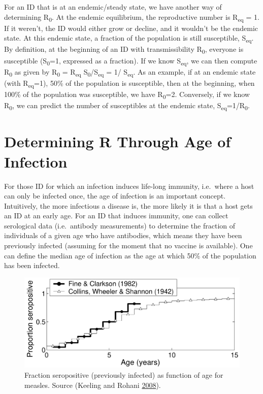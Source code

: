 \documentclass[]{book}
\theoremstyle{definition}
\theoremstyle{definition}
\theoremstyle{definition}
\theoremstyle{remark}
\begin{document}
For an ID that is at an endemic/steady state, we have another way of
determining R\textsubscript{0}. At the endemic equilibrium, the
reproductive number is R\textsubscript{eq} = 1. If it weren't, the ID
would either grow or decline, and it wouldn't be the endemic state. At
this endemic state, a fraction of the population is still susceptible,
S\textsubscript{eq}. By definition, at the beginning of an ID with
transmissibility R\textsubscript{0}, everyone is susceptible
(S\textsubscript{0}=1, expressed as a fraction). If we know
S\textsubscript{eq}, we can then compute R\textsubscript{0} as given by
R\textsubscript{0} = R\textsubscript{eq}
S\textsubscript{0}/S\textsubscript{eq} = 1/ S\textsubscript{eq}. As an
example, if at an endemic state (with R\textsubscript{eq}=1), 50\% of
the population is susceptible, then at the beginning, when 100\% of the
population was susceptible, we have R\textsubscript{0}=2. Conversely, if
we know R\textsubscript{0}, we can predict the number of susceptibles at
the endemic state, S\textsubscript{eq}=1/R\textsubscript{0}.

\section{Determining R Through Age of
Infection}\label{determining-r-through-age-of-infection}

For those ID for which an infection induces life-long immunity,
i.e.~where a host can only be infected once, the age of infection is an
important concept. Intuitively, the more infectious a disease is, the
more likely it is that a host gets an ID at an early age. For an ID that
induces immunity, one can collect serological data (i.e.~antibody
measurements) to determine the fraction of individuals of a given age
who have antibodies, which means they have been previously infected
(assuming for the moment that no vaccine is available). One can define
the median age of infection as the age at which 50\% of the population
has been infected.

\begin{figure}
\centering
\includegraphics{./images/R0age.pdf}
\caption{\label{fig:R0age}Fraction seropositive (previously infected) as
function of age for measles. Source (Keeling and Rohani
\protect\hyperlink{ref-keeling08}{2008}).}
\end{figure}
\end{document}
